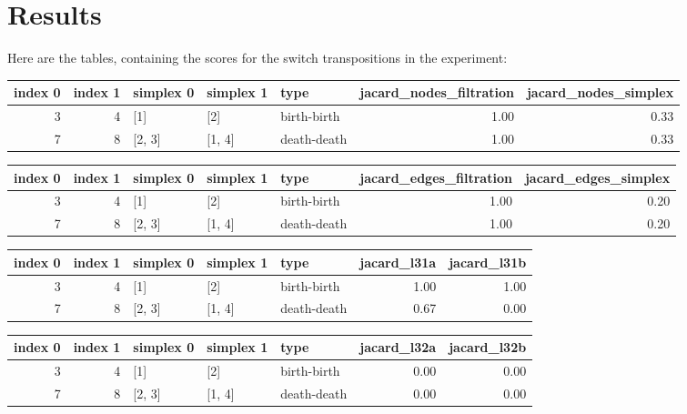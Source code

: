 \documentclass{article}
\begin{document}
\section{Results}

\par Here are the tables, containing the scores for the switch transpositions in the experiment:

\begin{center}
\begin{tabular}{rrlllrr}
\toprule
index 0 & index 1 & simplex 0 & simplex 1 & type & jacard\_nodes\_filtration & jacard\_nodes\_simplex \\
\midrule
3 & 4 & [1] & [2] & birth-birth & 1.00 & 0.33 \\
7 & 8 & [2, 3] & [1, 4] & death-death & 1.00 & 0.33 \\
\bottomrule
\end{tabular}
\end{center}

\begin{center}
\begin{tabular}{rrlllrr}
\toprule
index 0 & index 1 & simplex 0 & simplex 1 & type & jacard\_edges\_filtration & jacard\_edges\_simplex \\
\midrule
3 & 4 & [1] & [2] & birth-birth & 1.00 & 0.20 \\
7 & 8 & [2, 3] & [1, 4] & death-death & 1.00 & 0.20 \\
\bottomrule
\end{tabular}
\end{center}

\begin{center}
\begin{tabular}{rrlllrr}
\toprule
index 0 & index 1 & simplex 0 & simplex 1 & type & jacard\_l31a & jacard\_l31b \\
\midrule
3 & 4 & [1] & [2] & birth-birth & 1.00 & 1.00 \\
7 & 8 & [2, 3] & [1, 4] & death-death & 0.67 & 0.00 \\
\bottomrule
\end{tabular}
\end{center}

\begin{center}
\begin{tabular}{rrlllrr}
\toprule
index 0 & index 1 & simplex 0 & simplex 1 & type & jacard\_l32a & jacard\_l32b \\
\midrule
3 & 4 & [1] & [2] & birth-birth & 0.00 & 0.00 \\
7 & 8 & [2, 3] & [1, 4] & death-death & 0.00 & 0.00 \\
\bottomrule
\end{tabular}
\end{center}
\end{document}
